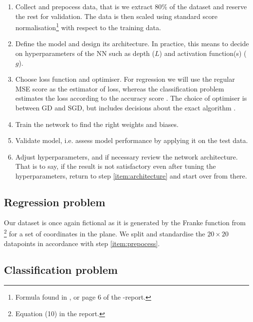     \begin{enumerate}[label=(\roman*)]
        \item\label{item:prepocess} Collect and prepocess data, that is we extract 80\% of the dataset and reserve the rest for validation. The data is then scaled using standard score normalisation\footnote{Formula found in \cite{mhjensen}, or page 6 of the \projectOne-report.} with respect to the training data.
        \item\label{item:architecture} Define the model and design its architecture. In practice, this means to decide on hyperparameters of the NN such as depth ($L$) and activation function(s) ($g$).
        \item\label{item:optimiser} Choose loss function and optimiser. For regression we will use the regular MSE score  as the estimator of loss, whereas the classification problem estimates the loss according to the accuracy score .  The choice of optimiser is between GD and SGD, but includes decisions about the exact algorithm .
        \item\label{item:train} Train the network to find the right weights and biases.
        \item\label{item:assess} Validate model, i.e. assess model performance by applying it on the test data.
        \item\label{item:review} Adjust hyperparameters, and if necessary review the network architecture. That is to say, if the result is not satisfactory even after tuning the hyperparameters, return to step \ref{item:architecture} and start over from there. 
    \end{enumerate}

    

\subsection{Regression problem}\label{sec:analysis_regression}


    Our dataset is once again fictional as it is generated by the Franke function from \projectOne\footnote{Equation (10) in the report.} for a set of coordinates in the plane. We split and standardise the $20\times 20$ datapoints in accordance with step \ref{item:prepocess}. 






\subsection{Classification problem}\label{sec:analysis_classification}




